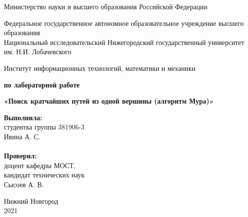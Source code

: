 \documentclass{report}
\begin{document}
\begin{titlepage}

\begin{center}
Министерство науки и высшего образования Российской Федерации
\end{center}

\begin{center}
Федеральное государственное автономное образовательное учреждение высшего образования \\
Национальный исследовательский Нижегородский государственный университет им. Н.И. Лобачевского
\end{center}

\begin{center}
Институт информационных технологий, математики и механики
\end{center}

\vspace{4em}

\begin{center}
\textbf{ по лабораторной работе} \\
\end{center}
\begin{center}
\textbf{\Large«Поиск кратчайших путей из одной вершины (алгоритм Мура)»} \\
\end{center}

\vspace{4em}

\newbox{\lbox}
\newlength{\maxl}
\setlength{\maxl}{\wd\lbox}
\hfill\parbox{7cm}{
\hspace*{5cm}\hspace*{-5cm}\textbf{Выполнила:} \\ студентка группы 381906-3 \\ Ивина А. С.\\
\\
\hspace*{5cm}\hspace*{-5cm}\textbf{Проверил:}\\ доцент кафедры МОСТ, \\ кандидат технических наук \\ Сысоев А. В.\\
}
\vspace{\fill}

\begin{center} Нижний Новгород \\ 2021 \end{center}

\end{titlepage}
\end{document}
